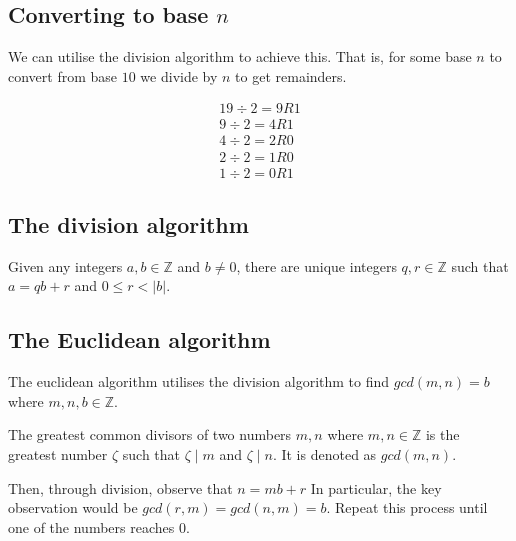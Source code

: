 \documentclass[a4paper]{article}
\theoremstyle{plain}
\newtheorem{thm}{Theorem}[section]
\theoremstyle{definition}
\newtheorem{defn}{Definition}[section]
\newtheorem{exmp}{Example}[section]
\theoremstyle{remark}
\begin{document}
\subsection{Converting to base $n$}
We can utilise the division algorithm to achieve this. That is, for some base $n$ to convert from  base $10$ we divide by $n$ to get remainders.
\begin{tcolorbox}[colback=black!3!white,colframe=black!60!white,title=\begin{exmp}Division of binary \label{Division of binary}\end{exmp}]
        
                \begin{align}
                19 \div 2 = 9 R 1 \\
		9 \div 2 = 4 R 1 \\
		4 \div 2 = 2 R 0 \\
		2 \div 2 = 1 R 0 \\
		1 \div 2 = 0 R 1 
                \end{align}
\end{tcolorbox}
\subsection{The division algorithm}
\begin{tcolorbox}[colback=black!3!white,colframe=black!60!white,title=\begin{thm}The division algorithm \label{The division algorithm}\end{thm}]
	Given any integers $a,b \in \mathbb{Z}$ and $b \neq 0$, there are unique integers $q,r \in \mathbb{Z}$ such that $a = qb+r$ and $0 \le r < |b|$.
\end{tcolorbox}
\subsection{The Euclidean algorithm}
The euclidean algorithm utilises the division algorithm to find $gcd(m,n)=b$ where $m,n,b \in \mathbb{Z}$.
\begin{tcolorbox}[colback=black!3!white,colframe=black!60!white,title=\begin{defn}Greatest Common Divisor \label{Greatest Common Divisor}\end{defn}]
The greatest common divisors of two numbers $m,n$ where $m,n \in \mathbb{Z}$ is the greatest number $\zeta$ such that $\zeta  \mid  m$ and $\zeta  \mid  n$. It is denoted as $gcd(m,n)$.
\end{tcolorbox}
Then, through division, observe that 
$n = mb + r$
In particular, the key observation would be $gcd(r,m) = gcd(n,m) = b$.
Repeat this process until one of the numbers reaches $0$.
\end{document}
